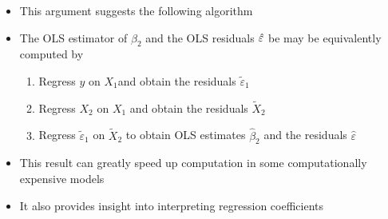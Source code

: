 \documentclass[notes=show]{beamer}
\begin{document}
\begin{frame}%


\begin{itemize}
\item This argument suggests the following algorithm

\item The OLS estimator of $\beta _{2}$ and the OLS residuals $\hat{%
\varepsilon}$ be may be equivalently computed by

\begin{enumerate}
\item Regress $y$ on $X_{1}$and obtain the residuals $\tilde{\varepsilon}%
_{1} $

\item Regress $X_{2}$ on $X_{1}$ and obtain the residuals $\tilde{X}_{2}$

\item Regress $\tilde{\varepsilon}_{1}$ on $\tilde{X}_{2}$ to obtain OLS
estimates $\widehat{\beta }_{2}$ and the residuals $\hat{\varepsilon}$
\end{enumerate}

\item This result can greatly speed up computation in some computationally
expensive models

\item It also provides insight into interpreting regression coefficients
\end{itemize}

\end{frame}%
\end{document}
